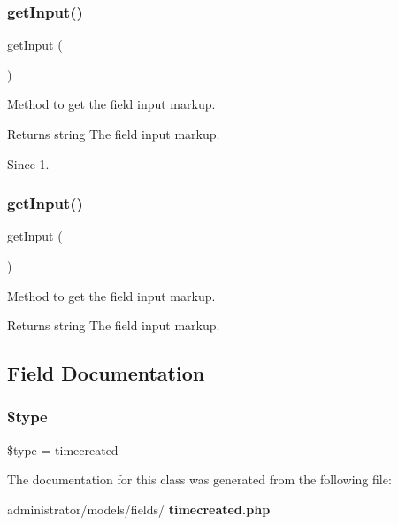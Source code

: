 \subsubsection{get\+Input()\hspace{0.1cm}{\footnotesize\ttfamily [1/2]}}
{\footnotesize\ttfamily get\+Input (\begin{DoxyParamCaption}{ }\end{DoxyParamCaption})\hspace{0.3cm}{\ttfamily [protected]}}

Method to get the field input markup.

\begin{DoxyReturn}{Returns}
string The field input markup.
\end{DoxyReturn}
\begin{DoxySince}{Since}
1. 
\end{DoxySince}
\mbox{\label{class_j_form_field_timecreated_a4380f30ae9202fa49ebd2439572f9cdb}} 
\subsubsection{get\+Input()\hspace{0.1cm}{\footnotesize\ttfamily [2/2]}}
{\footnotesize\ttfamily get\+Input (\begin{DoxyParamCaption}{ }\end{DoxyParamCaption})\hspace{0.3cm}{\ttfamily [protected]}}

Method to get the field input markup.

\begin{DoxyReturn}{Returns}
string The field input markup. 
\end{DoxyReturn}


\subsection{Field Documentation}
\mbox{\label{class_j_form_field_timecreated_a9a4a6fba2208984cabb3afacadf33919}} 
\subsubsection{\$type}
{\footnotesize\ttfamily \$type = \textquotesingle{}timecreated\textquotesingle{}\hspace{0.3cm}{\ttfamily [protected]}}



The documentation for this class was generated from the following file\+:\begin{DoxyCompactItemize}
\item 
administrator/models/fields/\textbf{ timecreated.\+php}\end{DoxyCompactItemize}
